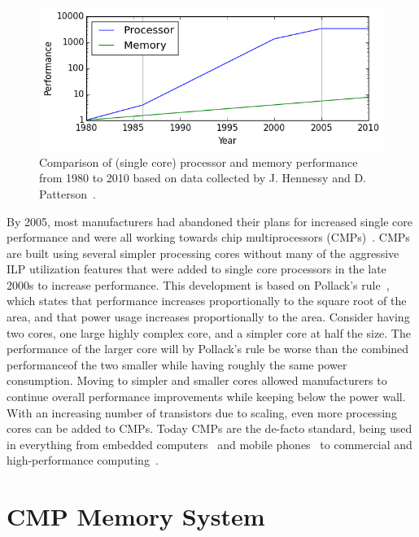 \begin{figure}[ht]
\centering
\includegraphics[width=.8\textwidth]{figures/introduction/memory-gap}
\caption{Comparison of (single core) processor and memory performance from 1980 to 2010 based on data collected by J. Hennessy and D. Patterson~\cite{hennessy2012}.}
\label{fig:introduction:memgap}
\end{figure}

By 2005, most manufacturers had abandoned their plans for increased single core performance and were all working towards chip multiprocessors (CMPs)~\cite{Sutter2005}.
CMPs are built using several simpler processing cores without many of the aggressive ILP utilization features that were added to single core processors in the late 2000s to increase performance.
This development is based on Pollack's rule~\cite{Borkar2007}, which states that performance increases proportionally to the square root of the area, and that power usage increases proportionally to the area.
Consider having two cores, one large highly complex core, and a simpler core at half the size.
The performance of the larger core will by Pollack's rule be worse than the combined performance\footnotemark of the two smaller while having roughly the same power consumption.
Moving to simpler and smaller cores allowed manufacturers to continue overall performance improvements while keeping below the power wall.
With an increasing number of transistors due to scaling, even more processing cores can be added to CMPs.
Today CMPs are the de-facto standard, being used in everything from embedded computers~\cite{ARM2010} and mobile phones~\cite{Ho2014} to commercial and high-performance computing~\cite{Thomadakis2011, Jain2013}.


\section{CMP Memory System}

